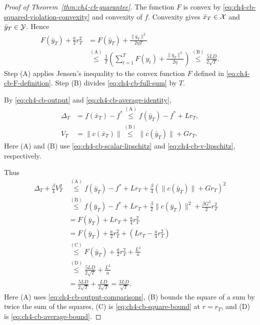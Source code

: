 \begin{proof}[Proof of Theorem~\ref{thm:ch4-cb-guarantee}]
The function $F$ is convex by \eqref{eq:ch4-cb-squared-violation-convexity}
and convexity of $f$.
Convexity gives $\bar x_T\in\mathcal{X}$ and $\bar y_T\in\mathcal{Y}$. Hence
\begin{equation}\label{eq:ch4-cb-average-bound}
\begin{aligned}
F(\bar y_T)+\frac a2r_T^2
&=F(\bar y_T)+\frac{\|q_T\|^2}{2\eta T}\\
&\overset{\mathrm{(A)}}{\le}
\frac1T\left(\sum_{t=1}^T F(y_t)+\frac{\|q_T\|^2}{2\eta}\right)
\overset{\mathrm{(B)}}{\le}\frac{5LD}{2\sqrt T}.
\end{aligned}
\end{equation}
\nopagebreak[3]
Step (A) applies Jensen's inequality to the convex function $F$ defined in
\eqref{eq:ch4-cb-F-definition}. Step (B) divides
\eqref{eq:ch4-cb-full-sum} by $T$.

By \eqref{eq:ch4-cb-output} and \eqref{eq:ch4-cb-average-identity},
\begin{equation}\label{eq:ch4-cb-output-comparisons}
\begin{aligned}
\Delta_T&=f(\bar x_T)-f^*
\overset{\mathrm{(A)}}{\le}
f(\bar y_T)-f^*+Lr_T,\\
V_T&=\|c(\bar x_T)\|
\overset{\mathrm{(B)}}{\le}\|c(\bar y_T)\|+Gr_T.
\end{aligned}
\end{equation}
\nopagebreak[3]
Here (A) and (B) use \eqref{eq:ch4-cb-scalar-lipschitz} and
\eqref{eq:ch4-cb-v-lipschitz}, respectively.

Thus
\begin{equation}\label{eq:ch4-cb-joint-transfer}
\begin{aligned}
\Delta_T+\frac\beta4V_T^2
&\overset{\mathrm{(A)}}{\le}
f(\bar y_T)-f^*+Lr_T
+\frac\beta4\left(\|c(\bar y_T)\|+Gr_T\right)^2\\
&\overset{\mathrm{(B)}}{\le}
f(\bar y_T)-f^*+Lr_T
+\frac\beta2\|c(\bar y_T)\|^2+\frac{\beta G^2}{2}r_T^2\\
&=F(\bar y_T)+Lr_T+\frac a4r_T^2\\
&=F(\bar y_T)+\frac a2r_T^2+\left(Lr_T-\frac a4r_T^2\right)\\
&\overset{\mathrm{(C)}}{\le}
F(\bar y_T)+\frac a2r_T^2+\frac{L^2}{a}\\
&\overset{\mathrm{(D)}}{\le}\frac{5LD}{2\sqrt T}+\frac{L^2}{a}
\\&=\frac{5LD}{2\sqrt T}+\frac{LD}{2\sqrt T}
=\frac{3LD}{\sqrt T}.
\end{aligned}
\end{equation}
\nopagebreak[3]
Here (A) uses \eqref{eq:ch4-cb-output-comparisons}, (B) bounds the square
of a sum by twice the sum of the squares, (C) is \eqref{eq:ch4-cb-square-bound}
at $r=r_T$, and (D) is \eqref{eq:ch4-cb-average-bound}.


\end{proof}
